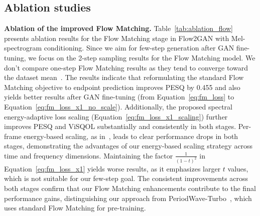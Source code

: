 \documentclass{article} %
\begin{document}
\vspace{-0.5em}
\subsection{Ablation studies}
\label{ssec:ablation}
\vspace{-0.5em}

\noindent\textbf{Ablation of the improved Flow Matching.} 
Table~\ref{tab:ablation_flow} presents ablation results for the Flow Matching stage in Flow2GAN with Mel-spectrogram conditioning. Since we aim for few-step generation after GAN fine-tuning, we focus on the 2-step sampling results for the Flow Matching model. We don't compare one-step Flow Matching results as they tend to converge toward the dataset mean~\citep{shortcut}. 
The results indicate that reformulating the standard Flow Matching objective to endpoint prediction improves PESQ by 0.455 and also yields better results after GAN fine-tuning (from Equation~\ref{eq:fm_loss} to Equation~\ref{eq:fm_loss_x1_no_scale}). Additionally, the proposed spectral energy-adaptive loss scaling (Equation~\ref{eq:fm_loss_x1_scaling}) further improves PESQ and ViSQOL substantially and consistently in both stages. 
Per-frame energy-based scaling, as in~\citep{priorgrad,rfwave}, leads to clear performance drops in both stages, demonstrating the advantages of our energy-based scaling strategy across time and frequency dimensions.
Maintaining the factor $\frac{1}{(1 - t)^2}$ in Equation~\ref{eq:fm_loss_x1} yields worse results, as it emphasizes larger $t$ values, which is not suitable for our few-step goal. The consistent improvements across both stages confirm that our Flow Matching enhancements contribute to the final performance gains, distinguishing our approach from PeriodWave-Turbo~\citep{periodwave_turbo}, which uses standard Flow Matching for pre-training.
\end{document}
